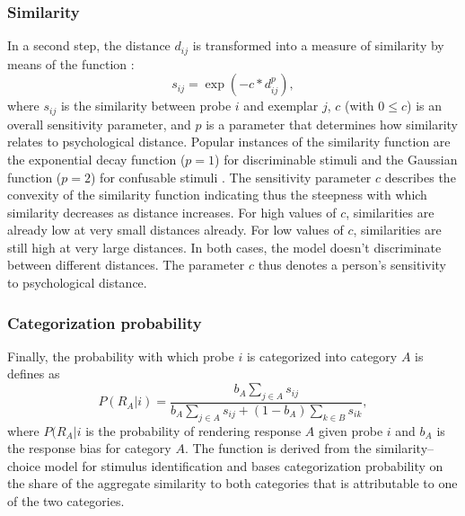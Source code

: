 \documentclass[a4paper,man,natbib]{apa6}
\begin{document}
\subsubsection{Similarity}
In a second step, the distance $d_{ij}$ is transformed into a measure of similarity by means of the function \citep{nosofsky1986attention}:
\begin{equation}
s_{ij} = \exp\left(-c*d_{ij}^p\right),
\end{equation}
where $s_{ij}$ is the similarity between probe $i$ and exemplar $j$, $c$ (with $0 \leq c$) is an overall sensitivity parameter, and $p$ is a parameter that determines how similarity relates to psychological distance. Popular instances of the similarity function are the exponential decay function ($p = 1$) for discriminable stimuli and the Gaussian function ($p = 2$) for confusable stimuli \citep{ennis1988confusable, nosofsky1985luce}. The sensitivity parameter $c$ describes the convexity of the similarity function indicating thus the steepness with which similarity decreases as distance increases. For high values of $c$, similarities are already low at very small distances already. For low values of $c$, similarities are still high at very large distances. In both cases, the model doesn't discriminate between different distances. The parameter $c$ thus denotes a person's sensitivity to psychological distance.

\subsubsection{Categorization probability}
Finally, the probability with which probe $i$ is categorized into category $A$ is defines as 
\begin{equation}
P(R_{A}|i) = \frac{b_{A}\sum\limits_{j \in A} s_{ij}}{b_{A}\sum\limits_{j \in A} s_{ij} + (1 - b_{A})\sum\limits_{k \in B} s_{ik}},
\end{equation}
where $P(R_{A}|i$ is the probability of rendering response $A$ given probe $i$ and $b_{A}$ is the response bias for category $A$. The function is derived from the similarity--choice model for stimulus identification \citep{luce1963detection, shepard1957stimulus} and bases categorization probability on the share of the aggregate similarity to both categories that is attributable to one of the two categories.
\end{document}
